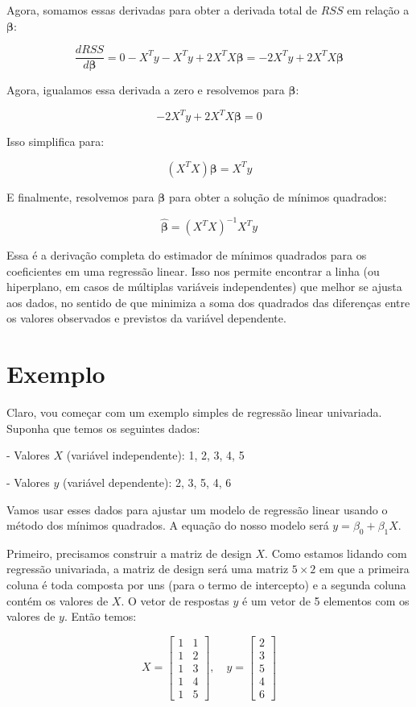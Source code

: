 \documentclass[12pt,a4paper, brazil]{article}
\begin{document}
Agora, somamos essas derivadas para obter a derivada total de $RSS$ em relação a $\boldsymbol{\beta}$:

$$\frac{dRSS}{d\boldsymbol{\beta}} = 0 - X^Ty - X^Ty + 2X^TX\boldsymbol{\beta} = -2X^Ty + 2X^TX\boldsymbol{\beta}$$

Agora, igualamos essa derivada a zero e resolvemos para $\boldsymbol{\beta}$:

$$-2X^Ty + 2X^TX\boldsymbol{\beta} = 0$$

Isso simplifica para:

$$(X^TX)\boldsymbol{\beta} = X^Ty$$

E finalmente, resolvemos para $\boldsymbol{\beta}$ para obter a solução de mínimos quadrados:

$$\hat{\boldsymbol{\beta}} = (X^TX)^{-1}X^Ty$$

Essa é a derivação completa do estimador de mínimos quadrados para os coeficientes em uma regressão linear. Isso nos permite encontrar a linha (ou hiperplano, em casos de múltiplas variáveis independentes) que melhor se ajusta aos dados, no sentido de que minimiza a soma dos quadrados das diferenças entre os valores observados e previstos da variável dependente.

\section{Exemplo}

Claro, vou começar com um exemplo simples de regressão linear univariada. Suponha que temos os seguintes dados:

- Valores $X$ (variável independente): 1, 2, 3, 4, 5

- Valores $y$ (variável dependente): 2, 3, 5, 4, 6

Vamos usar esses dados para ajustar um modelo de regressão linear usando o método dos mínimos quadrados. A equação do nosso modelo será $y = \beta_0 + \beta_1X$.

Primeiro, precisamos construir a matriz de design $X$. Como estamos lidando com regressão univariada, a matriz de design será uma matriz $5 \times 2$ em que a primeira coluna é toda composta por uns (para o termo de intercepto) e a segunda coluna contém os valores de $X$. O vetor de respostas $y$ é um vetor de 5 elementos com os valores de $y$. Então temos:

$$X = \begin{bmatrix} 1 & 1 \\ 1 & 2 \\ 1 & 3 \\ 1 & 4 \\ 1 & 5 \end{bmatrix}, \quad y = \begin{bmatrix} 2 \\ 3 \\ 5 \\ 4 \\ 6 \end{bmatrix}$$
\end{document}
